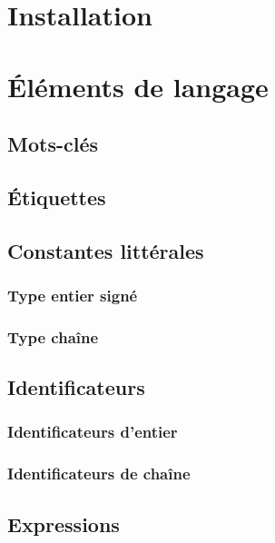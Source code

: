 \documentclass[11pt,a4paper,titlepage,openany]{book}
\begin{document}
    \renewcommand\rmdefault{pag}
    \selectfont
    \renewcommand{\sfdefault}{pag}


    \renewcommand{\contentsname}{Sommaire}
    \tableofcontents


    \chapter{Installation}

    \chapter{Éléments de langage}
    \section{Mots-clés}
    \section{Étiquettes}
    \section{Constantes littérales}
        \subsection{Type entier signé}
        \subsection{Type chaîne}

    \section{Identificateurs}
        \subsection{Identificateurs d'entier}
        \subsection{Identificateurs de chaîne}

    \section{Expressions}
\end{document}
